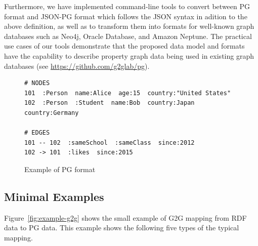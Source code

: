 \documentclass[runningheads]{llncs}
\begin{document}
Furthermore, we have implemented command-line tools to convert between PG format and JSON-PG format which follows the JSON syntax in adition to the above definition, as well as to transform them into formats for well-known graph databases such as Neo4j, Oracle Database, and Amazon Neptune. The practical use cases of our tools demonstrate that the proposed data model and formats have the capability to describe property graph data being used in existing graph databases (see \url{https://github.com/g2glab/pg}).

\begin{figure}[!t]
\begin{scriptsize}
\begin{verbatim}
# NODES
101  :Person  name:Alice  age:15  country:"United States"
102  :Person  :Student  name:Bob  country:Japan  country:Germany

# EDGES
101 -- 102  :sameSchool  :sameClass  since:2012
102 -> 101  :likes  since:2015
\end{verbatim}
\end{scriptsize}
\caption{Example of PG format}
\label{fig:example-pg}
\end{figure}


\subsection{Minimal Examples}
Figure~\ref{fig:example-g2g} shows the small example of G2G mapping from RDF data to PG data. This example shows the following five types of the typical mapping.
\end{document}

